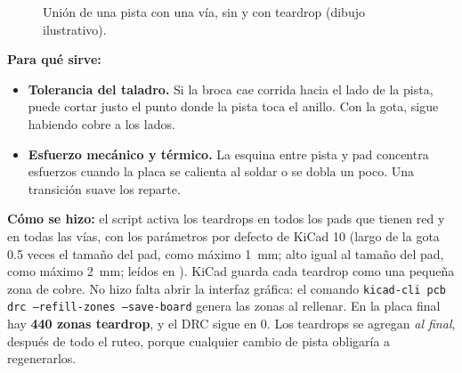 \begin{figure}[htbp]
\centering
{}
\caption{Unión de una pista con una vía, sin y con teardrop (dibujo ilustrativo).}
\label{fig:c06-teardrop}
\end{figure}

\textbf{Para qué sirve:}
\begin{itemize}
  \item \textbf{Tolerancia del taladro.} Si la broca cae corrida hacia el lado de la pista, puede cortar justo el
        punto donde la pista toca el anillo. Con la gota, sigue habiendo cobre a los lados.
  \item \textbf{Esfuerzo mecánico y térmico.} La esquina entre pista y pad concentra esfuerzos cuando la placa se
        calienta al soldar o se dobla un poco. Una transición suave los reparte.
\end{itemize}

\textbf{Cómo se hizo:} el script  activa los teardrops en todos los pads que
tienen red y en todas las vías, con los parámetros por defecto de KiCad 10 (largo de la gota \num{0.5} veces el
tamaño del pad, como máximo \SI{1}{\milli\meter}; alto igual al tamaño del pad, como máximo \SI{2}{\milli\meter};
leídos en ). KiCad
guarda cada teardrop como una pequeña zona de cobre. No hizo falta abrir la interfaz gráfica: el comando
\texttt{kicad-cli pcb drc --refill-zones --save-board} genera las zonas al rellenar. En la placa final hay
\textbf{440 zonas teardrop}, y el DRC sigue en 0. Los teardrops se agregan \emph{al final}, después de todo el ruteo,
porque cualquier cambio de pista obligaría a regenerarlos.

